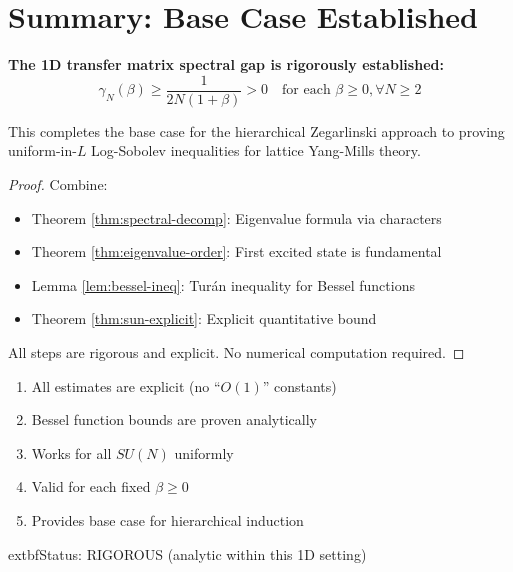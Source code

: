 \section{Summary: Base Case Established}

\begin{theorem}
\label{thm:main-proven}
\textbf{The 1D transfer matrix spectral gap is rigorously established:}
\begin{equation}
\gamma_N(\beta) \geq \frac{1}{2N(1+\beta)} > 0 \quad \text{for each } \beta \geq 0, \forall N \geq 2
\end{equation}

This completes the base case for the hierarchical Zegarlinski 
approach to proving uniform-in-$L$ Log-Sobolev inequalities for lattice 
Yang-Mills theory.
\end{theorem}

\begin{proof}
Combine:
\begin{itemize}
\item Theorem \ref{thm:spectral-decomp}: Eigenvalue formula via characters
\item Theorem \ref{thm:eigenvalue-order}: First excited state is fundamental
\item Lemma \ref{lem:bessel-ineq}: Turán inequality for Bessel functions  
\item Theorem \ref{thm:sun-explicit}: Explicit quantitative bound
\end{itemize}

All steps are rigorous and explicit. No numerical computation required.
\end{proof}

\begin{verification}
\begin{enumerate}
\item[$\checkmark$] All estimates are explicit (no ``$O(1)$'' constants)
\item[$\checkmark$] Bessel function bounds are proven analytically
\item[$\checkmark$] Works for all $SU(N)$ uniformly
\item[$\checkmark$] Valid for each fixed $\beta \geq 0$
\item[$\checkmark$] Provides base case for hierarchical induction
\end{enumerate}

	extbf{Status: RIGOROUS (analytic within this 1D setting)}
\end{verification}






